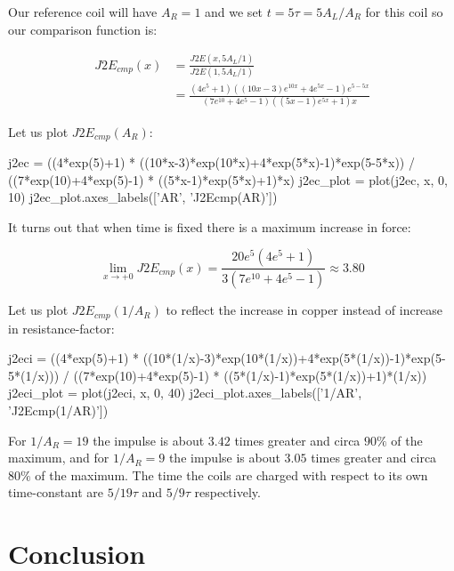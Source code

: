 \documentclass[]{../common/elementary-physics}
\begin{document}
Our reference coil will have $A_R = 1$ and we set $t = 5 \tau = 5 A_L/A_R$ for this coil so our comparison function is:

\begin{subequations}
\begin{align}
J2E_{cmp}(x) &= \frac{J2E(x,5 A_L/1)}{J2E(1,5 A_L/1)} \\
&= \frac{(4e^5+1)((10x-3)e^{10x}+4e^{5x}-1)e^{5-5x}}{(7e^{10}+4e^5-1)((5x-1)e^{5x}+1)x}
\end{align}
\end{subequations}

Let us plot $J2E_{cmp}(A_R)$:

\begin{sagesilent}
j2ec = ((4*exp(5)+1) * ((10*x-3)*exp(10*x)+4*exp(5*x)-1)*exp(5-5*x)) / ((7*exp(10)+4*exp(5)-1) * ((5*x-1)*exp(5*x)+1)*x)
j2ec_plot = plot(j2ec, x, 0, 10)
j2ec_plot.axes_labels(['AR', 'J2Ecmp(AR)'])
\end{sagesilent}


It turns out that when time is fixed there is a maximum increase in force:

\begin{equation}
\lim_{x \to +0} J2E_{cmp}(x) = \frac{20 e^5(4e^5+1)}{3(7e^{10}+4e^5-1)} \approx 3.80
\end{equation}

Let us plot $J2E_{cmp}(1/A_R)$ to reflect the increase in copper instead of increase in resistance-factor:

\begin{sagesilent}
j2eci = ((4*exp(5)+1) * ((10*(1/x)-3)*exp(10*(1/x))+4*exp(5*(1/x))-1)*exp(5-5*(1/x))) / ((7*exp(10)+4*exp(5)-1) * ((5*(1/x)-1)*exp(5*(1/x))+1)*(1/x))
j2eci_plot = plot(j2eci, x, 0, 40)
j2eci_plot.axes_labels(['1/AR', 'J2Ecmp(1/AR)'])
\end{sagesilent}


For $1/A_R = 19$ the impulse is about $3.42$ times greater and circa $90 \percent$ of the maximum, and for $1/A_R = 9$ the impulse is about $3.05$ times greater and circa $80 \percent$ of the maximum. The time the coils are charged with respect to its own time-constant are $5/19 \tau$ and $5/9 \tau$ respectively.

\section{Conclusion}
\end{document}
